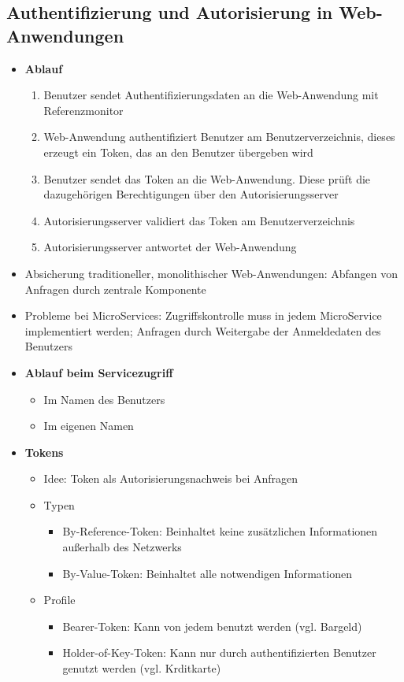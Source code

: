 \subsection{Authentifizierung und Autorisierung in Web-Anwendungen}
\begin{itemize}
	\item \textbf{Ablauf}
	\begin{enumerate}
		\item Benutzer sendet Authentifizierungsdaten an die Web-Anwendung mit Referenzmonitor
		\item Web-Anwendung authentifiziert Benutzer am Benutzerverzeichnis, dieses erzeugt ein Token, das an den Benutzer übergeben wird
		\item Benutzer sendet das Token an die Web-Anwendung. Diese prüft die dazugehörigen Berechtigungen über den Autorisierungsserver
		\item Autorisierungsserver validiert das Token am Benutzerverzeichnis
		\item Autorisierungsserver antwortet der Web-Anwendung
	\end{enumerate}
	\item Absicherung traditioneller, monolithischer Web-Anwendungen: Abfangen von Anfragen durch zentrale Komponente
	\item Probleme bei MicroServices: Zugriffskontrolle muss in jedem MicroService implementiert werden; Anfragen durch Weitergabe der Anmeldedaten des Benutzers
	\item \textbf{Ablauf beim Servicezugriff}
	\begin{itemize}
		\item Im Namen des Benutzers
		\item Im eigenen Namen
	\end{itemize}
	\item \textbf{Tokens}
	\begin{itemize}
		\item Idee: Token als Autorisierungsnachweis bei Anfragen
		\item Typen
		\begin{itemize}
			\item By-Reference-Token: Beinhaltet keine zusätzlichen Informationen außerhalb des Netzwerks
			\item By-Value-Token: Beinhaltet alle notwendigen Informationen
		\end{itemize}
		\item Profile
		\begin{itemize}
			\item Bearer-Token: Kann von jedem benutzt werden (vgl. Bargeld)
			\item Holder-of-Key-Token: Kann nur durch authentifizierten Benutzer genutzt werden (vgl. Krditkarte)
		\end{itemize}
	\end{itemize}
\end{itemize}


